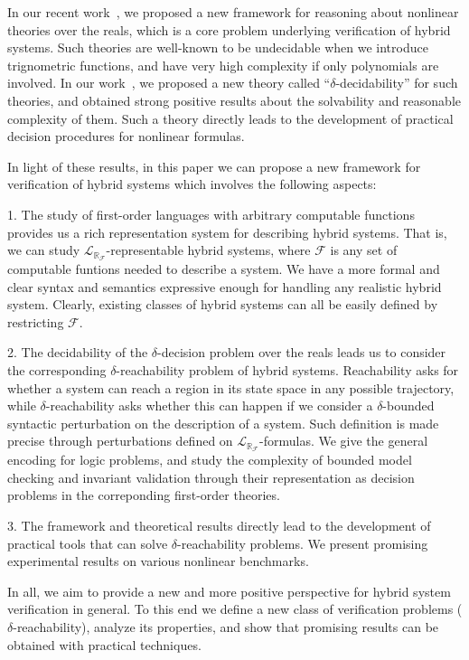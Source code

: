 \documentclass[envcountsect]{llncs}
\newcommand{\lrf}{\mathcal{L}_{\mathbb{R}_{\mathcal{F}}}}
\begin{document}
In our recent work~\cite{}, we proposed a new framework for reasoning about 
nonlinear theories over the reals, which is a core problem underlying
verification of hybrid systems. Such theories are well-known to be undecidable
when we introduce trignometric functions, and have very high complexity if only
polynomials are involved. In our work~\cite{}, we proposed a new theory called
``$\delta$-decidability'' for such theories, and obtained strong positive
results about the solvability and reasonable complexity of them. Such a theory
directly leads to the development of practical decision procedures for nonlinear
formulas. 

In light of these results, in this paper we can propose a new framework for 
verification of hybrid systems which involves the following aspects: 

1. The study of first-order languages with arbitrary computable functions 
provides us a rich representation system for describing hybrid systems. That is,
we can study $\lrf$-representable hybrid systems, where $\mathcal{F}$ is any set
of computable funtions needed to describe a system. We have a more formal and
clear syntax and semantics expressive enough for handling any realistic hybrid
system. Clearly, existing classes of hybrid systems can all be easily defined by
restricting $\mathcal{F}$. 

2. The decidability of the $\delta$-decision problem over the reals leads  us to
consider the corresponding $\delta$-reachability problem of hybrid systems.
Reachability asks for whether a system can reach a region in its state space in
any possible trajectory, while $\delta$-reachability asks whether this can
happen if we consider a $\delta$-bounded syntactic perturbation on the
description of a system. Such definition is made precise through perturbations
defined on $\lrf$-formulas. We give the general encoding for logic problems, and
study the complexity of bounded model checking and invariant validation through
their representation as decision problems in the correponding first-order
theories. 

3. The framework and theoretical results directly lead to the development of 
practical tools that can solve $\delta$-reachability problems. We present
promising experimental results on various nonlinear benchmarks. 

In all, we aim to provide a new and more positive perspective for hybrid system
verification in general. To this end we define a new class of verification
problems ($\delta$-reachability), analyze its properties, and show that
promising results can be obtained with practical techniques. 
\end{document}
